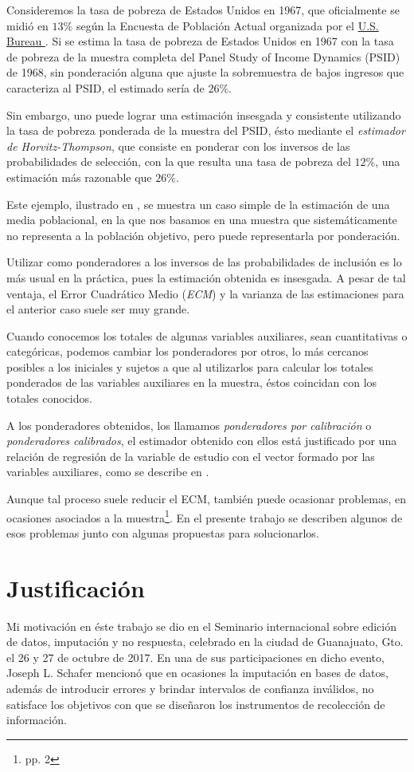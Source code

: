 \documentclass[a4paper,twoside,openright,12pt]{book}
\theoremstyle{definition}
\newcommand{\citeOne}[1]{\hyperlink{bib}{#1}}
\numberwithin{equation}{chapter}
\numberwithin{figure}{chapter}
\numberwithin{table}{chapter}
\numberwithin{theorem}{chapter}
\numberwithin{lemma}{chapter}
\begin{document}
Consideremos la tasa de pobreza de Estados Unidos en 1967, que oficialmente se midió en $13\% $ según la Encuesta de Población Actual organizada por el \citeOne{\color{myblue}U.S. Bureau }\cite{census}. Si se estima la tasa de pobreza de Estados Unidos en 1967 con la tasa de pobreza de la muestra completa del Panel Study of Income Dynamics (PSID) de 1968, sin ponderación alguna que ajuste la sobremuestra de bajos ingresos que caracteriza al PSID, el estimado sería de $26\%$.

Sin embargo, uno puede lograr una estimación insesgada y consistente utilizando la tasa de pobreza ponderada de la muestra del PSID, ésto mediante el \textsl{estimador de Horvitz-Thompson}, que consiste en ponderar con los inversos de las probabilidades de selección, con la que resulta una tasa de pobreza del $12\%$, una estimación más razonable que $26\%$.

Este ejemplo, ilustrado en \cite{solon}, se muestra un caso simple de la estimación de una media poblacional, en la que nos basamos en una muestra que sistemáticamente no representa a la población objetivo, pero puede representarla por ponderación.

Utilizar como ponderadores a los inversos de las probabilidades de inclusión es lo más usual en la práctica, pues la estimación obtenida es insesgada. A pesar de tal ventaja, el Error Cuadrático Medio (\textsl{ECM}) y la varianza de las estimaciones para el anterior caso suele ser muy grande.

Cuando conocemos los totales de algunas variables auxiliares, sean cuantitativas o categóricas, podemos cambiar los ponderadores por otros, lo más cercanos posibles a los iniciales y sujetos a que al utilizarlos para calcular los totales ponderados de las variables auxiliares en la muestra, éstos coincidan con los totales conocidos.

A los ponderadores obtenidos, los llamamos \textsl{ponderadores por calibración} o \textsl{ponderadores calibrados}, el estimador obtenido con ellos está justificado por una relación de regresión de la variable de estudio con el vector formado por las variables auxiliares, como se describe en \cite{CIS-106196}.

Aunque tal proceso suele reducir el ECM, también puede ocasionar problemas, en ocasiones asociados a la muestra\footnote{\cite{CIS-549814} pp. 2}. En el presente trabajo se describen algunos de esos problemas junto con algunas propuestas para solucionarlos.
\section*{Justificación}
Mi motivación en éste trabajo se dio en el Seminario internacional sobre edición de datos, imputación y no respuesta, celebrado en la ciudad de Guanajuato, Gto. el 26 y 27 de octubre de 2017. En una de sus participaciones en dicho evento, Joseph L. Schafer mencionó que en ocasiones la imputación en bases de datos, además de introducir errores y brindar intervalos de confianza inválidos, no satisface los objetivos con que se diseñaron los instrumentos de recolección de información.
\end{document}
